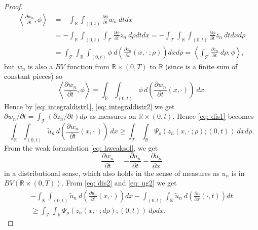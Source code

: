 \documentclass[12pt]{article}
\newcommand{\R}{\mathbb{R}}
\newcommand{\T}{\mathcal{T}}
\newcommand{\p}{\rho}
\newcommand{\1}{\mathds{1}}
\theoremstyle{definition}
\begin{document}
\begin{proof}
    \begin{equation}\label{eq: integraldistr1}
        \begin{split}
            \left\langle \frac{\partial w_n}{\partial t},\phi \right\rangle & = -\int_\R \int_{(0,t)} \frac{\partial \phi}{ \partial t} w_n ~dtdx \\ & =  -\int_\R \int_{(0,t)} \int_{\T} \frac{\partial \phi}{ \partial t} z_n ~d\p dtdx = -\int_{\T} \int_\R   \int_{(0,t)} \frac{\partial \phi}{ \partial t} z_n ~dtdxd\p \\ & = \int_{\T}  \int_\R \int_{(0,t)} \phi ~d\left(\frac{\partial z_n}{\partial t} (x, \cdot~;\p)\right) dx d\p = \left\langle \int_{\T} \frac{\partial z_n}{ \partial t} ~d\p, \phi \right\rangle,
        \end{split}
    \end{equation} but $w_n$ is also a $BV$ function from $\R \times (0,T)$ to $\R$ (since is a finite sum of constant pieces) so \begin{equation}\label{eq: integraldistr2}
        \left\langle \frac{\partial w_n}{\partial t},\phi \right\rangle = \int_\R \int_{(0,t)} \phi\, d\left(\frac{\partial w_n}{ \partial t} (x, \cdot) \right)~dx.
    \end{equation}
    Hence by \eqref{eq: integraldistr1}, \eqref{eq: integraldistr2} we get 
    $\partial w_n/\partial t=\int_{\T}(\partial z_n/\partial t)d\p$ as measures on $\R \times (0,t)$. Hence \eqref{eq: dis1} becomes \begin{equation}\label{eq: dis2}
       \int_\R \int_{(0,t)} \tilde{u}_n \,d\left(\frac{\partial w_n}{\partial t} (x,\cdot~)\right) ~dx  \geq \int_{\T}\int_\R \Psi_\p(z_n(x,\cdot~;\p);(0,t)) ~dxd\p.
    \end{equation} From the weak formulation \eqref{eq: hweaksol}, we get
    \begin{equation}\label{eq: ug2}
        \frac{\partial w_n}{\partial t}=-\frac{\partial u_n}{\partial t}-\frac{\partial u_n}{\partial x}
    \end{equation} in a distributional sense, which also holds in the sense of measures as $u_n$ is in $BV(\R \times (0,T))$. From \eqref{eq: dis2} and \eqref{eq: ug2} we get \begin{multline}\label{eq: dis3}
         -\int_\R \int_{(0,t)} \tilde{u}_n ~d\left(\frac{\partial u_n}{\partial t} (x,\cdot)\right) dx  -\int_{(0,t)}\int_\R  \tilde{u}_n ~d\left(\frac{\partial u}{\partial x}(\cdot,t)\right) dt\\ \geq \int_{\T} \int_\R \Psi_\p(z_n(x,\cdot~;d\p);(0,t)) ~d\p dx.

\end{multline}
\end{proof}
\end{document}
